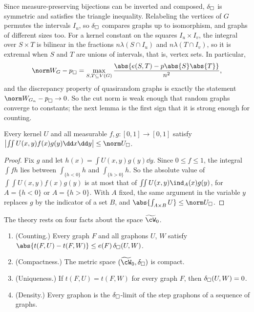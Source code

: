 \begin{refsection}

Since measure-preserving bijections can be inverted and composed, $\delta_{\square}$ is symmetric and satisfies the triangle inequality. Relabeling the vertices of $G$ permutes the intervals $I_u$, so $\delta_{\square}$ compares graphs up to isomorphism, and graphs of different sizes too. For a kernel constant on the squares $I_u\times I_v$, the integral over $S\times T$ is bilinear in the fractions $n\lambda(S\cap I_u)$ and $n\lambda(T\cap I_v)$, so it is extremal when $S$ and $T$ are unions of intervals, that is, vertex sets. In particular,
\[
  \graphoncut{W_G-p}=\max_{S,T\subseteq V(G)}\frac{\abs{e(S,T)-p\abs{S}\abs{T}}}{n^2},
\]
and the discrepancy property of quasirandom graphs is exactly the statement $\graphoncut{W_{G_n}-p}\to0$. So the cut norm is weak enough that random graphs converge to constants; the next lemma is the first sign that it is strong enough for counting.

\begin{lemma}\label{lem:graphon:functions}
Every kernel $U$ and all measurable $f,g\colon[0,1]\to[0,1]$ satisfy $\bigl\lvert\int\!\!\int U(x,y)f(x)g(y)\dd x\dd y\bigr\rvert\le\graphoncut{U}$.
\end{lemma}

\begin{proof}
Fix $g$ and let $h(x)=\int U(x,y)g(y)\dd y$. Since $0\le f\le1$, the integral $\int fh$ lies between $\int_{\{h<0\}}h$ and $\int_{\{h>0\}}h$. So the absolute value of $\int\!\!\int U(x,y)f(x)g(y)$ is at most that of $\int\!\!\int U(x,y)\ind_A(x)g(y)$, for $A=\{h<0\}$ or $A=\{h>0\}$. With $A$ fixed, the same argument in the variable $y$ replaces $g$ by the indicator of a set $B$, and $\abs{\int_{A\times B}U}\le\graphoncut{U}$.
\end{proof}

The theory rests on four facts about the space $\graphonspace$.

\begin{theorem}\label{thm:graphon:main}
\leavevmode
\begin{enumerate}
\item (Counting.) Every graph $F$ and all graphons $U$, $W$ satisfy $\abs{t(F,U)-t(F,W)}\le e(F)\,\graphondelta(U,W)$.
\item (Compactness.) The metric space $(\graphonspace,\graphondelta)$ is compact.
\item (Uniqueness.) If $t(F,U)=t(F,W)$ for every graph $F$, then $\delta_{\square}(U,W)=0$.
\item (Density.) Every graphon is the $\delta_{\square}$-limit of the step graphons of a sequence of graphs.
\end{enumerate}
\end{theorem}


\end{refsection}
